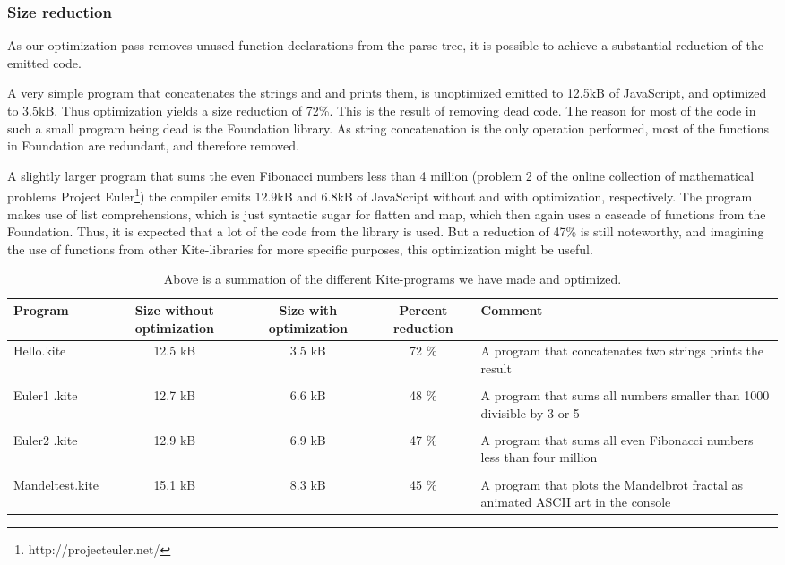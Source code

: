 \subsubsection{Size reduction}
As our optimization pass removes unused function declarations from the parse tree, it is possible to achieve a substantial reduction of the emitted code.

A very simple program that concatenates the strings  and  and prints them, is unoptimized emitted to 12.5kB of JavaScript, and optimized to 3.5kB. Thus optimization yields a size reduction of 72\%. This is the result of removing dead code. The reason for most of the code in such a small program being dead is the Foundation library. As string concatenation is the only operation performed, most of the functions in Foundation are redundant, and therefore removed.

A slightly larger program that sums the even Fibonacci numbers less than 4 million (problem 2 of the online collection of mathematical problems Project Euler\footnote{http://projecteuler.net/}) the compiler emits 12.9kB and 6.8kB of JavaScript without and with optimization, respectively. The program makes use of list comprehensions, which is just syntactic sugar for flatten and map, which then again uses a cascade of functions from the Foundation. Thus, it is expected that a lot of the code from the library is used. But a reduction of 47\% is still noteworthy, and imagining the use of functions from other Kite-libraries for more specific purposes, this optimization might be useful.

\begin{table}[H]
  \centering
  \begin{tabulary}{1.0\textwidth}{LCCCL}
    \textbf{Program} & \textbf{Size without optimization} & \textbf{Size with optimization} & \textbf{Percent reduction} & \textbf{Comment} \\
    \hline
    Hello.kite       & 12.5 kB & 3.5 kB & 72 \% & A program that concatenates two strings prints the result \\
    & & & & \\ \hline
    Euler1 .kite       & 12.7 kB & 6.6 kB & 48 \% & A program that sums all numbers smaller than 1000 divisible by 3 or 5 \\
    & & & & \\ \hline
    Euler2 .kite       & 12.9 kB & 6.9 kB & 47 \% & A program that sums all even Fibonacci numbers less than four million \\
    & & & & \\ \hline
    Mandeltest.kite       & 15.1 kB & 8.3 kB & 45 \% & A program that plots the Mandelbrot fractal as animated ASCII art in the console\\
  \end{tabulary}
  \caption{Above is a summation of the different Kite-programs we have made and optimized.}
\end{table}

